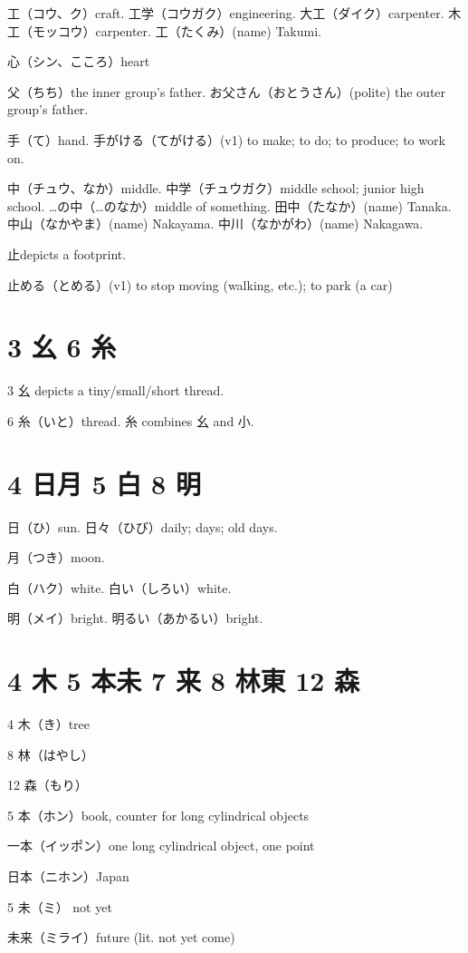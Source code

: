 工（コウ、ク）craft.
工学（コウガク）engineering.
大工（ダイク）carpenter.
木工（モッコウ）carpenter.
工（たくみ）(name) Takumi.

心（シン、こころ）heart

父（ちち）the inner group's father.
お父さん（おとうさん）(polite) the outer group's father.

手（て）hand.
手がける（てがける）(v1) to make; to do; to produce; to work on.

中（チュウ、なか）middle.
中学（チュウガク）middle school; junior high school.
…の中（…のなか）middle of something.
田中（たなか）(name) Tanaka.
中山（なかやま）(name) Nakayama.
中川（なかがわ）(name) Nakagawa.

止depicts a footprint.

止める（とめる）(v1) to stop moving (walking, etc.); to park (a car)

\section{3 幺 6 糸}

3 幺 depicts a tiny/small/short thread.

6 糸（いと）thread.
糸 combines 幺 and 小.

\section{4 日月 5 白 8 明}

日（ひ）sun.
日々（ひび）daily; days; old days.

月（つき）moon.

白（ハク）white.
白い（しろい）white.

明（メイ）bright.
明るい（あかるい）bright.

\section{4 木 5 本未 7 来 8 林東 12 森}

4 木（き）tree

8 林（はやし）

12 森（もり）

5 本（ホン）book, counter for long cylindrical objects

一本（イッポン）one long cylindrical object, one point

日本（ニホン）Japan

5 未（ミ） not yet

未来（ミライ）future (lit. not yet come)

